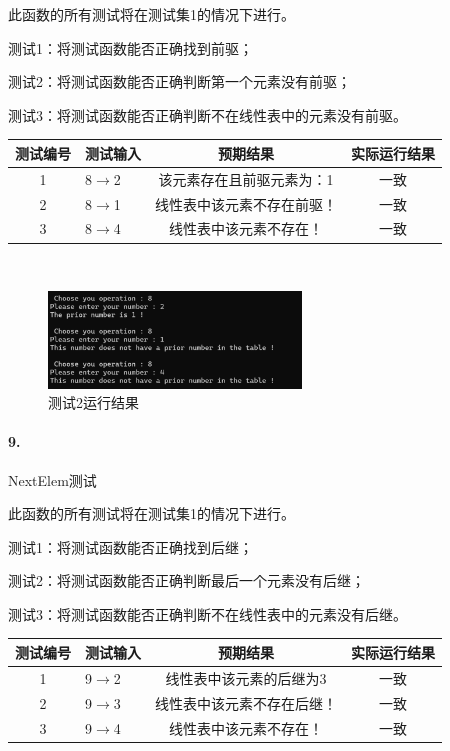 \documentclass[supercite]{Experimental_Report}
\theoremstyle{definition}
\begin{document}
    此函数的所有测试将在测试集1的情况下进行。

    测试1：将测试函数能否正确找到前驱；

    测试2：将测试函数能否正确判断第一个元素没有前驱；

    测试3：将测试函数能否正确判断不在线性表中的元素没有前驱。

\vspace{0.5em}

\begin{tabular}{|c|l|c|c|}
	\hline
	测试编号 & 测试输入 & 预期结果 & 实际运行结果 \\
	\hline
	1 & 8$\rightarrow$2 & 该元素存在且前驱元素为：1 & 一致 \\
	\hline
	2 & 8$\rightarrow$1 & 线性表中该元素不存在前驱！ & 一致 \\
	\hline
	3 & 8$\rightarrow$4 & 线性表中该元素不存在！ & 一致 \\
	\hline
\end{tabular}

~\

 \begin{figure}[H]
 	\centering
 	\includegraphics[width=0.6\textwidth]{images/线性表测试8.png}
 	\caption{测试2运行结果}
 	\label{txlab}
 \end{figure}


\paragraph{ 9.}NextElem测试

    此函数的所有测试将在测试集1的情况下进行。

    测试1：将测试函数能否正确找到后继；

    测试2：将测试函数能否正确判断最后一个元素没有后继；

    测试3：将测试函数能否正确判断不在线性表中的元素没有后继。

\vspace{0.5em}

\begin{tabular}{|c|l|c|c|}
	\hline
	测试编号 & 测试输入 & 预期结果 & 实际运行结果 \\
	\hline
	1 & 9$\rightarrow$2 & 线性表中该元素的后继为3 & 一致 \\
	\hline
	2 & 9$\rightarrow$3 & 线性表中该元素不存在后继！ & 一致 \\
	\hline
	3 & 9$\rightarrow$4 & 线性表中该元素不存在！ & 一致 \\
	\hline
\end{tabular}
\end{document}
